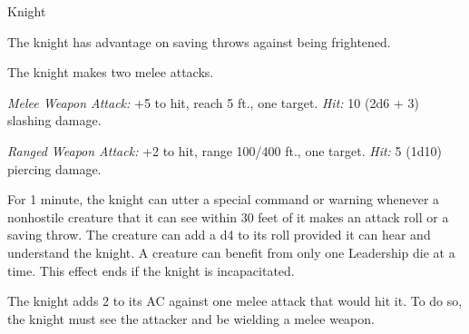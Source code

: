 \documentclass[10pt,a4paper,twoside,bg=none,twocolumn,openany,nodeprecatedcode]{dndbook}
\begin{document}
\begin{DndMonster}[float=t]{Knight}
\DndMonsterBasics[
armor-class = {18 (plate armor)},
hit-points = {\DndDice{8d8 + 16}},
speed = {30 ft.}
]
\DndMonsterAbilityScores[
 str = 16,
 dex = 11,
 con = 14,
 int = 11,
 wis = 11,
 cha = 15
]
\DndMonsterDetails[
saving-throws = {Con +4, Wis +2},
languages = {any one language (usually Common)},
challenge = 3,
]
The knight has advantage on saving throws against being frightened.

\par
{}
The knight makes two melee attacks.

\textsl{Melee Weapon Attack:} +5 to hit, reach 5 ft., one target. \textsl{Hit:} 10 (2d6 + 3) slashing damage.

\textsl{Ranged Weapon Attack:} +2 to hit, range 100/400 ft., one target. \textsl{Hit:} 5 (1d10) piercing damage.

For 1 minute, the knight can utter a special command or warning whenever a nonhostile creature that it can see within 30 feet of it makes an attack roll or a saving throw. The creature can add a d4 to its roll provided it can hear and understand the knight. A creature can benefit from only one Leadership die at a time. This effect ends if the knight is incapacitated.

\par
{}
The knight adds 2 to its AC against one melee attack that would hit it. To do so, the knight must see the attacker and be wielding a melee weapon.

\end{DndMonster}
\end{document}
